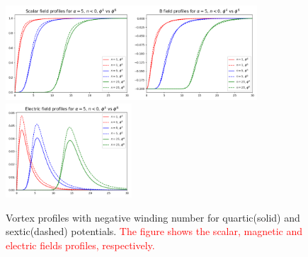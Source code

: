\begin{figure}[H]
\begin{center}
 \includegraphics[width=1.85in]{Chapter_2_Folder_1912.11321/figures/f_sixthvsfourth.pdf}\includegraphics[width=1.85in]{Chapter_2_Folder_1912.11321/figures/B_sixthvsfourth.pdf}
 \includegraphics[width=1.85in]{Chapter_2_Folder_1912.11321/figures/E_sixthvsfourth.pdf}
     \caption[This figure shows the vortex profiles with negative winding number for quartic and sextic potentials.]{{ \small Vortex profiles with negative winding number for quartic(solid) and sextic(dashed) potentials. \textcolor{red}{The figure shows the scalar, magnetic and electric fields profiles, respectively.}}} \label{sexticprofile}
    \end{center}
\end{figure}

